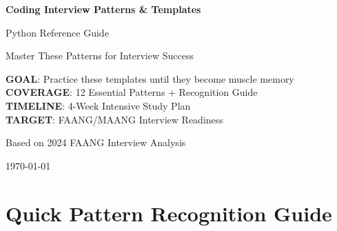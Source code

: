 \documentclass[10pt,a4paper]{article}
\begin{document}
\begin{titlepage}
\centering
{\huge\bfseries Coding Interview Patterns \& Templates\par}
\vspace{1cm}
{\LARGE Python Reference Guide\par}
\vspace{1.5cm}
{\Large Master These Patterns for Interview Success\par}
\vspace{2cm}

\begin{tcolorbox}[colback=blue!10,colframe=blue!50!black,width=0.8\textwidth]
\centering
\textbf{GOAL}: Practice these templates until they become muscle memory\\
\textbf{COVERAGE}: 12 Essential Patterns + Recognition Guide\\
\textbf{TIMELINE}: 4-Week Intensive Study Plan\\
\textbf{TARGET}: FAANG/MAANG Interview Readiness
\end{tcolorbox}

\vspace{2cm}
{\large Based on 2024 FAANG Interview Analysis\par}
\vfill
{\large \today\par}
\end{titlepage}

\tableofcontents
\newpage

\section{Quick Pattern Recognition Guide}
\end{document}

